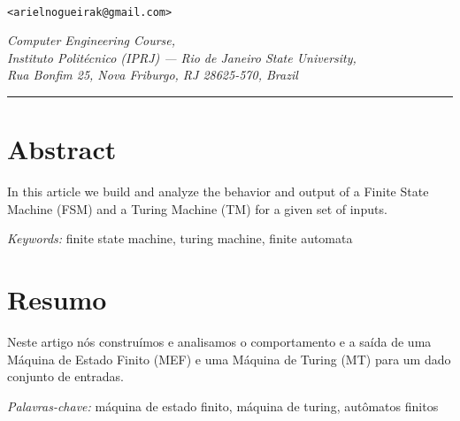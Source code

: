 \begin{center}
    \makeatletter

    \LARGE
    \@title

    \vspace{0.5cm}

    \large
    \@author \\
    \small
    \texttt{<arielnogueirak@gmail.com>}


    \vspace{0.5cm}

    \normalsize
    \textit{
       Computer Engineering Course, \\
       Instituto Politécnico (IPRJ) --- Rio de Janeiro State University, \\
       Rua Bonfim 25, Nova Friburgo, RJ 28625-570, Brazil
    }

    \vspace{0.5cm}
    \@date

    \makeatother
    \vspace{0.5cm}
    \hrule
\end{center}

\section*{Abstract}

In this article we build and analyze the behavior and output of a Finite State
Machine (FSM) and a Turing Machine (TM) for a given set of inputs.

\medskip
\noindent
\textit{Keywords:} finite state machine, turing machine, finite automata

\section*{Resumo}

Neste artigo nós construímos e analisamos o comportamento e a saída de uma
Máquina de Estado Finito (MEF) e uma Máquina de Turing (MT) para um dado
conjunto de entradas.

\medskip
\noindent
\textit{Palavras-chave:} máquina de estado finito, máquina de turing, autômatos
finitos